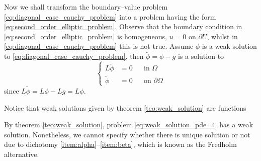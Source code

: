 Now we shall transform the boundary--value problem
\eqref{eq:diagonal_case_cauchy_problem} into a problem having the form
\eqref{eq:second_order_elliptic_problem}. Observe that the boundary condition in
\eqref{eq:second_order_elliptic_problem} is homogeneous, \ie $u = 0$ on
$\partial U$, whilst in \eqref{eq:diagonal_case_cauchy_problem} this is not
true. Assume $\phi$ is a weak solution to
\eqref{eq:diagonal_case_cauchy_problem}, then $\tilde{\phi} = \phi - g$ is a solution to
\begin{equation} \label{eq:weak_solution_pde_4}
	\left\{
		\begin{aligned}
			L \tilde{\phi} &= 0 & &\text{in } \Omega \\
			\tilde{\phi} &= 0 	& &\text{on } \partial \Omega 
		\end{aligned}
	\right.
\end{equation}
since $L \tilde{\phi} = L \phi - L g = L \phi$.

\begin{remark*}
	Notice that weak solutions given by theorem \eqref{teo:weak_solution} are functions 
\end{remark*}

By theorem \ref{teo:weak_solution}, problem \eqref{eq:weak_solution_pde_4} has a
weak solution. Nonetheless, we cannot specify whether there is unique solution
or not due to dichotomy \ref{item:alpha}--\ref{item:beta}, which is known as the
Fredholm alternative.
